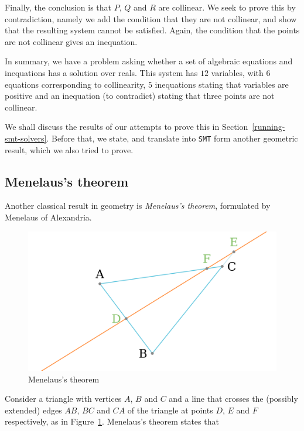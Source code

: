 \documentclass{amsart}
\theoremstyle{plain}
\theoremstyle{definition}
\theoremstyle{remark}
\begin{document}
Finally, the conclusion is that \(P\), \(Q\) and \(R\) are collinear. We
seek to prove this by contradiction, namely we add the condition that
they are not collinear, and show that the resulting system cannot be
satisfied. Again, the condition that the points are not collinear gives
an inequation.

In summary, we have a problem asking whether a set of algebraic
equations and inequations has a solution over reals. This system has
\(12\) variables, with \(6\) equations corresponding to collinearity,
\(5\) inequations stating that variables are positive and an inequation
(to contradict) stating that three points are not collinear.

We shall discuss the results of our attempts to prove this in Section~\ref{running-smt-solvers}.
Before that, we state, and translate into \texttt{SMT} form another geometric result, which 
we also tried to prove.

\subsection{Menelaus's theorem}

Another classical result in geometry is \emph{Menelaus's theorem}, formulated by Menelaus of Alexandria.

\begin{figure}
	\includegraphics[scale=0.15]{MenelausIllustration.png}
	\caption{Menelaus's theorem}\label{F:menelaus}
\end{figure}

Consider a triangle with vertices \(A\), \(B\) and \(C\) and a line that crosses the (possibly extended) edges \(AB\), \(BC\) and \(CA\) 
of the triangle at points \(D\), \(E\) and \(F\) respectively, as in Figure~\ref{F:menelaus}. Menelaus's theorem states that
\end{document}
